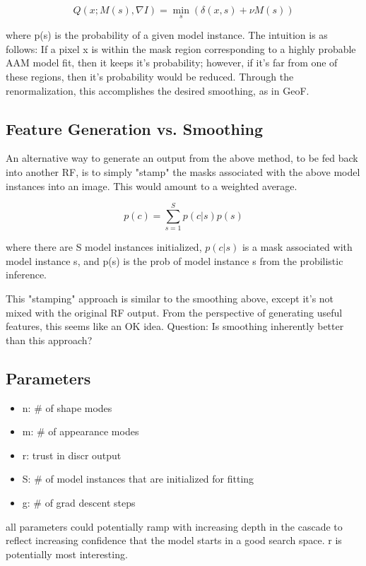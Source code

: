 \documentclass[10pt,twocolumn,letterpaper]{article}
\begin{document}
\[ Q(x; M(s), \nabla I) = \min_{s} (\delta (x,s) + \nu M(s)) \]

where p(s) is the probability of a given model instance.  The intuition is as follows: If a pixel x is within the mask region corresponding to a highly probable AAM model fit, then it keeps it's probability; however, if it's far from one of these regions, then it's probability would be reduced.  Through the renormalization, this accomplishes the desired smoothing, as in GeoF.

\subsection{Feature Generation vs. Smoothing}

An alternative way to generate an output from the above method, to be fed back into another RF, is to simply "stamp" the masks associated with the above model instances into an image.  This would amount to a weighted average.

\[ p(c) = \sum_{s=1}^S p(c|s)p(s) \]

where there are S model instances initialized, $p(c|s)$ is a mask associated with model instance s, and p(s) is the prob of model instance s from the probilistic inference.

This "stamping" approach is similar to the smoothing above, except it's not mixed with the original RF output.  From the perspective of generating useful features, this seems like an OK idea.  Question: Is smoothing inherently better than this approach?

\subsection{Parameters}

\begin{itemize}
\item n: \# of shape modes
\item m: \# of appearance modes
\item r: trust in discr output
\item S: \# of model instances that are initialized for fitting
\item g: \# of grad descent steps
\end{itemize}

all parameters could potentially ramp with increasing depth in the cascade to reflect increasing confidence that the model starts in a good search space.  r is potentially most interesting.
\end{document}
